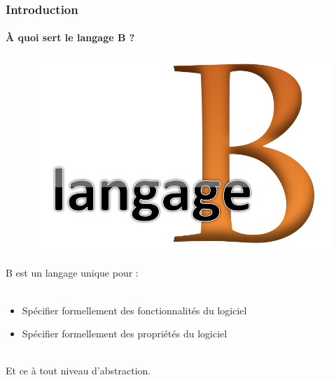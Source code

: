 \documentclass[11pt,a4paper,xcolor=table]{beamer} %
\begin{document}
\begin{frame}
\frametitle{Introduction}
\framesubtitle{À quoi sert le langage B ?}
\begin{figure}[h]
\centering
\includegraphics[scale=0.07]{ressources/logo2.png}
\end{figure}
\hspace{1em}
B est un langage unique pour :\\~\\
\pause
\begin{itemize}
\item Spécifier formellement des fonctionnalités du logiciel
\pause
\item Spécifier formellement des propriétés du logiciel
\pause
\end{itemize}
~\\
Et ce à tout niveau d'abstraction.
\end{frame}
\end{document}
